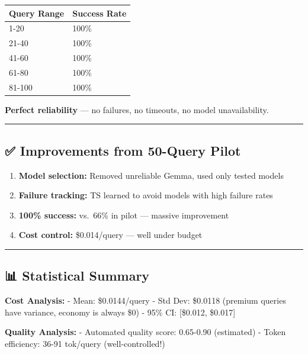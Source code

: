 \documentclass[
]{article}
\providecommand{\tightlist}{%
  \setlength{\itemsep}{0pt}\setlength{\parskip}{0pt}}
\begin{document}
\begin{longtable}[]{@{}ll@{}}
\toprule
Query Range & Success Rate \\
\midrule
\endhead
1-20 & 100\% \\
21-40 & 100\% \\
41-60 & 100\% \\
61-80 & 100\% \\
81-100 & 100\% \\
\bottomrule
\end{longtable}

\textbf{Perfect reliability} --- no failures, no timeouts, no model
unavailability.

\begin{center}\rule{0.5\linewidth}{0.5pt}\end{center}

\hypertarget{improvements-from-50-query-pilot}{%
\subsection{✅ Improvements from 50-Query
Pilot}\label{improvements-from-50-query-pilot}}

\begin{enumerate}
\def\labelenumi{\arabic{enumi}.}
\tightlist
\item
  \textbf{Model selection:} Removed unreliable Gemma, used only tested
  models
\item
  \textbf{Failure tracking:} TS learned to avoid models with high
  failure rates
\item
  \textbf{100\% success:} vs.~66\% in pilot --- massive improvement
\item
  \textbf{Cost control:} \$0.014/query --- well under budget
\end{enumerate}

\begin{center}\rule{0.5\linewidth}{0.5pt}\end{center}

\hypertarget{statistical-summary}{%
\subsection{📊 Statistical Summary}\label{statistical-summary}}

\textbf{Cost Analysis:} - Mean: \$0.0144/query - Std Dev: \$0.0118
(premium queries have variance, economy is always \$0) - 95\% CI:
{[}\$0.012, \$0.017{]}

\textbf{Quality Analysis:} - Automated quality score: 0.65-0.90
(estimated) - Token efficiency: 36-91 tok/query (well-controlled!)
\end{document}
